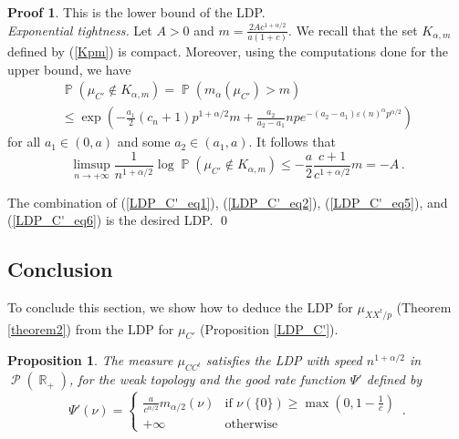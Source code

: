 \documentclass[11pt,a4paper]{article}
\DeclareMathOperator{\R}{\mathbb{R}}
\DeclareMathOperator{\PR}{\mathbb{P}}
\DeclareMathOperator{\PP}{\mathcal{P}}
\DeclareMathOperator{\1}{\mathbf{1}}
\newtheorem{Proposition}{Proposition}[section]
\theoremstyle{definition}
\newtheorem*{Proof}{Proof}
\begin{document}
\begin{Proof}
This is the lower bound of the LDP.\\

\emph{Exponential tightness.} Let $A>0$ and $m = \frac{2Ac^{1+\alpha/2}}{a(1+c)}$. We recall that the set $K_{\alpha,m}$ defined by (\ref{Kpm}) is compact. Moreover, using the computations done for the upper bound, we have
\begin{multline*}
\PR(\mu_{C'} \notin K_{\alpha,m}) = \PR(m_{\alpha}(\mu_{C'}) > m) \\
\le \exp \left( -\frac{a_1}{2} (c_n+1) p^{1+\alpha/2} m + \frac{a_2}{a_2-a_1} np e^{-(a_2-a_1) \varepsilon(n)^{\alpha} p^{\alpha/2}} \right)
\end{multline*}
for all $a_1 \in (0,a)$ and some $a_2 \in (a_1,a)$. It follows that
\begin{equation} \label{LDP_C'_eq6}
\limsup_{n \to +\infty} \frac{1}{n^{1+\alpha/2}} \log \PR(\mu_{C'} \notin K_{\alpha,m}) \le -\frac{a}{2} \frac{c+1}{c^{1+\alpha/2}} m = -A \, .
\end{equation}

The combination of (\ref{LDP_C'_eq1}), (\ref{LDP_C'_eq2}), (\ref{LDP_C'_eq5}), and (\ref{LDP_C'_eq6}) is the desired LDP. \qed
\end{Proof}




\subsection{Conclusion}

To conclude this section, we show how to deduce the LDP for $\mu_{XX^t/p}$ (Theorem \ref{theorem2}) from the LDP for $\mu_{C'}$ (Proposition \ref{LDP_C'}).

\begin{Proposition} \label{LDP_CC^t}
The measure $\mu_{CC^t}$ satisfies the LDP with speed $n^{1+\alpha/2}$ in $\PP(\R_+)$, for the weak topology and the good rate function $\Psi'$ defined by
\begin{equation} \label{Psi}
\Psi'(\nu) = \left\{ \begin{array}{ll} \frac{a}{c^{\alpha/2}} m_{\alpha/2}(\nu) & \textrm{if } \nu(\{0\}) \ge \max \left( 0,1-\frac1c \right) \\ +\infty & \textrm{otherwise} \end{array} \right. \, .
\end{equation}
\end{Proposition}
\end{document}
